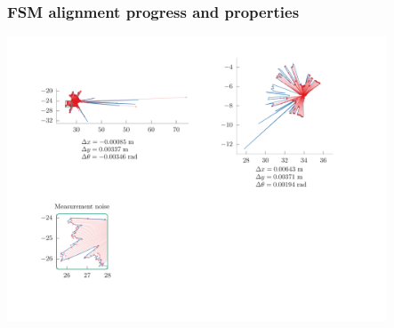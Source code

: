 \begin{frame}[noframenumbering]

  \frametitle{FSM alignment progress and properties}


  \begin{center}
    \includegraphics[height=240pt,width=320pt]{./figures/translation_and_rotation/all_fig12.png}
  \end{center}

\end{frame}
